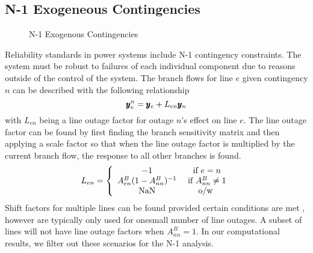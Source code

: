 \subsection{N-1 Exogeneous Contingencies}

\begin{figure}
\centering
{} 
\caption{N-1 Exogenous Contingencies}
\end{figure}


Reliability standards in power systems include N-1 contingency constraints.  The system must be robust to failures of each individual component due to reasons outside of the control of the system. The branch flows for line $e$ given contingency $n$ can be described with the following relationship
\begin{equation}\label{n1cont}
 \pmb{y}_e^n = \pmb{y}_e + L_{e n} \pmb{y}_n 
\end{equation}
with $L_{en}$ being a line outage factor for outage $n$'s effect on line $e$.  The line outage factor can be found by first finding the branch sensitivity matrix and then applying a scale factor so that when the line outage factor is multiplied by the current branch flow, the response to all other branches is found.
\begin{equation}
L_{en} = \left\{ \begin{array}{c c}
  -1 & \mbox{ if } e=n\\
  A_{en}^B (1-A_{nn}^B)^{-1} & \mbox{ if } A_{nn}^B \neq 1\\
  \mbox{NaN} & \mbox{ o/w }
  \end{array}
\right.
\end{equation}
Shift factors for multiple lines can be found provided certain conditions are met \cite{guler_2007}, however are typically only used for onesmall number of line outages.  A subset of lines will not have line outage factors when $A_{nn}^B = 1$.  In our computational results, we filter out these scenarios for the N-1 analysis.

